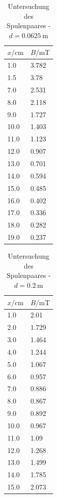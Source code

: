 \documentclass[11pt,ngerman,a4paper]{article}
\begin{document}
\begin{table}[H]
\centering
\begin{tabular}{ll}
\toprule
{$x / \si{\centi\meter}$} &{ $B/\si{\milli\tesla}$ }\\
\midrule
1.0 & 3.782\\
1.5 & 3.78\\
7.0 & 2.531\\
8.0 & 2.118\\
9.0 & 1.727\\
10.0 & 1.403\\
11.0 & 1.123\\
12.0 & 0.907\\
13.0 & 0.701\\
14.0 & 0.594\\
15.0 & 0.485\\
16.0 & 0.402\\
17.0 & 0.336\\
18.0 & 0.282\\
19.0 & 0.237\\
\bottomrule
\end{tabular}
\label{}
\caption{Untersuchung des Spulenpaares - $d =\SI{0.0625}{\meter}$}
\end{table}

\begin{table}[H]
\centering
\begin{tabular}{ll}
\toprule
{$x / \si{\centi\meter}$} &{ $B/\si{\milli\tesla}$ }\\
\midrule
1.0 & 2.01\\
2.0 & 1.729\\
3.0 & 1.464\\
4.0 & 1.244\\
5.0 & 1.067\\
6.0 & 0.957\\
7.0 & 0.886\\
8.0 & 0.867\\
9.0 & 0.892\\
10.0 & 0.967\\
11.0 & 1.09\\
12.0 & 1.268\\
13.0 & 1.499\\
14.0 & 1.785\\
15.0 & 2.073\\
\bottomrule
\end{tabular}
\label{}
\caption{Untersuchung des Spulenpaares - $d =\SI{0.2}{\meter}$}
\end{table}
\end{document}
